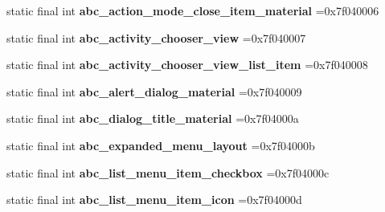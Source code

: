 \begin{DoxyCompactItemize}
\item 
\hypertarget{classcheck_1_1test_1_1_r_1_1layout_afa4cd09b51ea57d16c73125225864cc5}{}static final int {\bfseries abc\+\_\+action\+\_\+mode\+\_\+close\+\_\+item\+\_\+material} =0x7f040006\label{classcheck_1_1test_1_1_r_1_1layout_afa4cd09b51ea57d16c73125225864cc5}

\item 
\hypertarget{classcheck_1_1test_1_1_r_1_1layout_a43f01e991353d1e199dd375790e879e3}{}static final int {\bfseries abc\+\_\+activity\+\_\+chooser\+\_\+view} =0x7f040007\label{classcheck_1_1test_1_1_r_1_1layout_a43f01e991353d1e199dd375790e879e3}

\item 
\hypertarget{classcheck_1_1test_1_1_r_1_1layout_a78d5e907ed173bcf4c309852e974c8b0}{}static final int {\bfseries abc\+\_\+activity\+\_\+chooser\+\_\+view\+\_\+list\+\_\+item} =0x7f040008\label{classcheck_1_1test_1_1_r_1_1layout_a78d5e907ed173bcf4c309852e974c8b0}

\item 
\hypertarget{classcheck_1_1test_1_1_r_1_1layout_ad3ec5f861c63301c6f5b30a65f3cf81a}{}static final int {\bfseries abc\+\_\+alert\+\_\+dialog\+\_\+material} =0x7f040009\label{classcheck_1_1test_1_1_r_1_1layout_ad3ec5f861c63301c6f5b30a65f3cf81a}

\item 
\hypertarget{classcheck_1_1test_1_1_r_1_1layout_a5cd25f0b0f02d85dfb04aa8f84d575cb}{}static final int {\bfseries abc\+\_\+dialog\+\_\+title\+\_\+material} =0x7f04000a\label{classcheck_1_1test_1_1_r_1_1layout_a5cd25f0b0f02d85dfb04aa8f84d575cb}

\item 
\hypertarget{classcheck_1_1test_1_1_r_1_1layout_a80a19b28516870f09b675587076a9003}{}static final int {\bfseries abc\+\_\+expanded\+\_\+menu\+\_\+layout} =0x7f04000b\label{classcheck_1_1test_1_1_r_1_1layout_a80a19b28516870f09b675587076a9003}

\item 
\hypertarget{classcheck_1_1test_1_1_r_1_1layout_aec12733db72494ce85854d5f76a709fd}{}static final int {\bfseries abc\+\_\+list\+\_\+menu\+\_\+item\+\_\+checkbox} =0x7f04000c\label{classcheck_1_1test_1_1_r_1_1layout_aec12733db72494ce85854d5f76a709fd}

\item 
\hypertarget{classcheck_1_1test_1_1_r_1_1layout_a515e5f1f31d1825d210499eb2e592c8c}{}static final int {\bfseries abc\+\_\+list\+\_\+menu\+\_\+item\+\_\+icon} =0x7f04000d\label{classcheck_1_1test_1_1_r_1_1layout_a515e5f1f31d1825d210499eb2e592c8c}


\end{DoxyCompactItemize}
